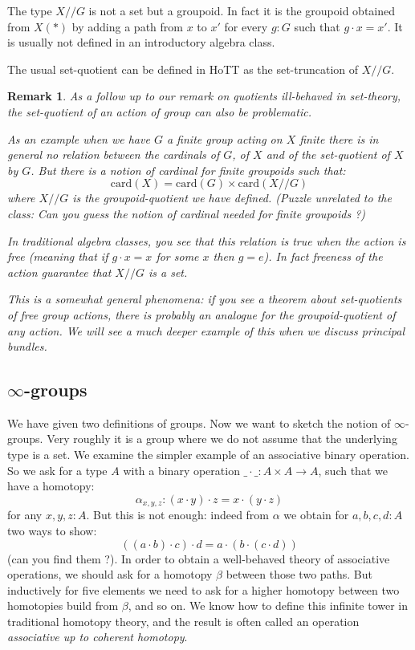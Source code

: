 \documentclass{article}
\newcommand{\sse}[1]{\medbreak \subsection{#1}}
\renewcommand{\r}{\rightarrow}
\newtheorem{remark}{Remark}
\begin{document}
The type $X//G$ is not a set but a groupoid. In fact it is the groupoid obtained from $X(*)$ by adding a path from $x$ to $x'$ for every $g:G$ such that $g\cdot x = x'$. It is usually not defined in an introductory algebra class. 

The usual set-quotient can be defined in HoTT as the set-truncation of $X//G$.%

\begin{remark}
As a follow up to our remark on quotients ill-behaved in set-theory, the set-quotient of an action of group can also be problematic. 

As an example when we have $G$ a finite group acting on $X$ finite there is in general no relation between the cardinals of $G$, of $X$ and of the set-quotient of $X$ by $G$. But there is a notion of cardinal for finite groupoids such that:
\[\mathrm{card}(X) = \mathrm{card}(G) \times \mathrm{card}(X//G)\]
where $X//G$ is the groupoid-quotient we have defined. (Puzzle unrelated to the class: Can you guess the notion of cardinal needed for finite groupoids ?)

In traditional algebra classes, you see that this relation is true when the action is free (meaning that if $g\cdot x =x$ for some $x$ then $g=e$). In fact freeness of the action guarantee that $X//G$ is a set.

This is a somewhat general phenomena: if you see a theorem about set-quotients of free group actions, there is probably an analogue for the groupoid-quotient of any action. We will see a much deeper example of this when we discuss principal bundles. 
\end{remark}


\sse{$\infty$-groups}

We have given two definitions of groups. Now we want to sketch the notion of $\infty$-groups. Very roughly it is a group where we do not assume that the underlying type is a set. We examine the simpler example of an associative binary operation. So we ask for a type $A$ with a binary operation $\_\cdot\_ : A\times A \r A$, such that we have a homotopy:
\[\alpha_{x,y,z} : (x\cdot y) \cdot z = x\cdot (y\cdot z)\] 
for any $x,y,z:A$. But this is not enough: indeed from $\alpha$ we obtain for $a,b,c,d:A$ two ways to show:
\[((a\cdot b)\cdot c )\cdot d = a\cdot(b\cdot (c\cdot d))\]
(can you find them ?). In order to obtain a well-behaved theory of associative operations, we should ask for a homotopy $\beta$ between those two paths. But inductively for five elements we need to ask for a higher homotopy between two homotopies build from $\beta$, and so on. We know how to define this infinite tower in traditional homotopy theory, and the result is often called an operation \emph{associative up to coherent homotopy}.
\end{document}

